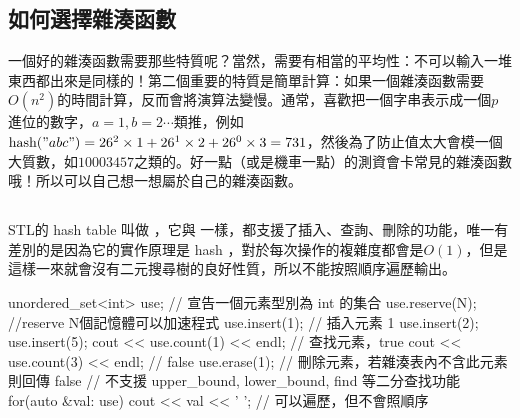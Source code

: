 \documentclass[main.tex]{subfiles}
\begin{document}
\subsection{如何選擇雜湊函數}
一個好的雜湊函數需要那些特質呢？當然，需要有相當的平均性：不可以輸入一堆東西都出來是同樣的！第二個重要的特質是簡單計算：如果一個雜湊函數需要$O(n^2)$的時間計算，反而會將演算法變慢。通常，喜歡把一個字串表示成一個$p$進位的數字，$a = 1, b = 2\cdots$類推，例如$\text{hash}("abc") = 26^2 \times 1 + 26^1 \times 2 + 26^0 \times 3 = 731$，然後為了防止值太大會模一個大質數，如$10003457$之類的。好一點（或是機車一點）的測資會卡常見的雜湊函數哦！所以可以自己想一想屬於自己的雜湊函數。
\subsection{} 
STL的 hash table 叫做 ，它與  一樣，都支援了插入、查詢、刪除的功能，唯一有差別的是因為它的實作原理是 hash ，對於每次操作的複雜度都會是$O(1)$，但是這樣一來就會沒有二元搜尋樹的良好性質，所以不能按照順序遍歷輸出。
\begin{C++}
unordered_set<int> use; // 宣告一個元素型別為 int 的集合
use.reserve(N); //reserve N個記憶體可以加速程式
use.insert(1); // 插入元素 1
use.insert(2);
use.insert(5);
cout << use.count(1) << endl; // 查找元素，true
cout << use.count(3) << endl; // false
use.erase(1); // 刪除元素，若雜湊表內不含此元素則回傳 false
// 不支援 upper_bound, lower_bound, find 等二分查找功能
for(auto &val: use)
    cout << val << ' ';
// 可以遍歷，但不會照順序
\end{C++}
\end{document}
